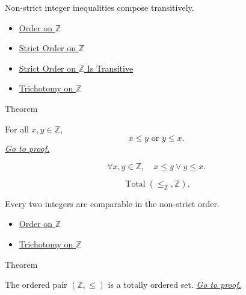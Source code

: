 \begin{remark*}[Interpretation]
Non-strict integer inequalities compose transitively.
\end{remark*}

\begin{dependencies}
\begin{itemize}
  \item \hyperref[def:order-on-z]{Order on $\mathbb{Z}$}
  \item \hyperref[def:strict-order-on-z]{Strict Order on $\mathbb{Z}$}
  \item \hyperref[thm:strict-order-on-z-transitive]{Strict Order on $\mathbb{Z}$ Is Transitive}
  \item \hyperref[thm:trichotomy-on-z]{Trichotomy on $\mathbb{Z}$}
\end{itemize}
\end{dependencies}

\begin{theorembox}{Theorem}
\begin{theorem}
\label{thm:order-on-z-total}
For all $x,y\in\mathbb{Z}$,
\[
x\le y\text{ or }y\le x.
\]
\hyperref[prf:order-on-z-total]{\textit{Go to proof.}}
\end{theorem}
\end{theorembox}

\begin{remark*}
\[
\forall x,y\in\mathbb{Z},\quad x\le y\lor y\le x.
\]
\end{remark*}

\begin{remark*}
\[
\operatorname{Total}(\le_{\mathbb{Z}},\mathbb{Z}).
\]
\end{remark*}

\begin{remark*}[Interpretation]
Every two integers are comparable in the non-strict order.
\end{remark*}

\begin{dependencies}
\begin{itemize}
  \item \hyperref[def:order-on-z]{Order on $\mathbb{Z}$}
  \item \hyperref[thm:trichotomy-on-z]{Trichotomy on $\mathbb{Z}$}
\end{itemize}
\end{dependencies}

\begin{theorembox}{Theorem}
\begin{theorem}
\label{thm:z-totally-ordered-set}
The ordered pair $(\mathbb{Z},\le)$ is a totally ordered set.
\hyperref[prf:z-totally-ordered-set]{\textit{Go to proof.}}
\end{theorem}
\end{theorembox}

